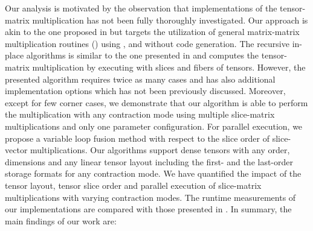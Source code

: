 Our analysis is motivated by the observation that  implementations of the tensor-matrix multiplication has not been fully thoroughly investigated. 
Our approach is akin to the one proposed in \cite{li:2015:input, shi:2016:tensor.contraction} but targets the utilization of general matrix-matrix multiplication routines () using ,  and  without code generation.
The recursive in-place algorithms is similar to the one presented in \cite{bassoy:2019:ttv} and computes the tensor-matrix multiplication by executing  with slices and fibers of tensors.
However, the presented algorithm requires twice as many cases and has also additional implementation options which has not been previously discussed.
Moreover, except for few corner cases, we demonstrate that our algorithm is able to perform the multiplication with any contraction mode using multiple slice-matrix multiplications and only one  parameter configuration.
For parallel execution, we propose a variable loop fusion method with respect to the slice order of slice-vector multiplications. 
Our algorithms support dense tensors with any order, dimensions and any linear tensor layout including the first- and the last-order storage formats for any contraction mode.
We have quantified the impact of the tensor layout, tensor slice order and parallel execution of slice-matrix multiplications with varying contraction modes.
The runtime measurements of our implementations are compared with those presented in \cite{springer:2018:design, abadi:2016:tensorflow,matthews:2018:high}.
In summary, the main findings of our work are:
